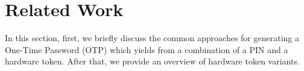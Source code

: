 

\section{Related Work}





%
%
%


In this section, first, we briefly discuss the common approaches for generating a One-Time Password (OTP) which yields from a combination of a PIN and a hardware token.  After that, we provide an overview of hardware token variants. 


